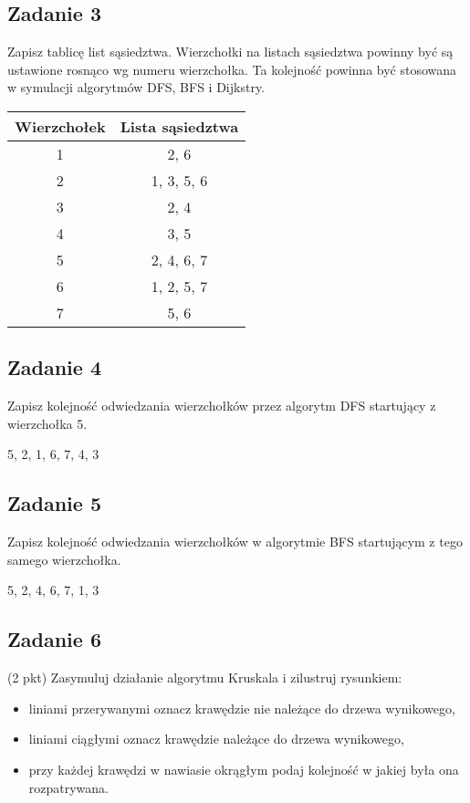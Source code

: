 \documentclass{article}
\begin{document}
\subsection*{Zadanie 3}
Zapisz tablicę list sąsiedztwa. Wierzchołki na listach sąsiedztwa powinny być są ustawione
rosnąco wg numeru wierzchołka. Ta kolejność powinna być stosowana w symulacji algorytmów DFS, BFS i Dijkstry.
\begin{center}
    \begin{tabular}{|c|c|}
        \hline
        Wierzchołek & Lista sąsiedztwa \\
        \hline
        1           & 2, 6             \\
        \hline
        2           & 1, 3, 5, 6       \\
        \hline
        3           & 2, 4             \\
        \hline
        4           & 3, 5             \\
        \hline
        5           & 2, 4, 6, 7       \\
        \hline
        6           & 1, 2, 5, 7       \\
        \hline
        7           & 5, 6             \\
        \hline
    \end{tabular}
\end{center}

\pagebreak
\subsection*{Zadanie 4}
Zapisz kolejność odwiedzania wierzchołków przez algorytm DFS startujący z wierzchołka 5.
\begin{center}
    5, 2, 1, 6, 7, 4, 3
\end{center}

\subsection*{Zadanie 5}
Zapisz kolejność odwiedzania wierzchołków w algorytmie BFS startującym z tego samego
wierzchołka.
\begin{center}
    5, 2, 4, 6, 7, 1, 3
\end{center}

\subsection*{Zadanie 6}
(2 pkt) Zasymuluj działanie algorytmu Kruskala i zilustruj rysunkiem:
\begin{itemize}
    \item liniami przerywanymi oznacz krawędzie nie należące do drzewa wynikowego,
    \item liniami ciągłymi oznacz krawędzie należące do drzewa wynikowego,
    \item przy każdej krawędzi w nawiasie okrągłym podaj kolejność w jakiej była ona rozpatrywana.
\end{itemize}
\end{document}
